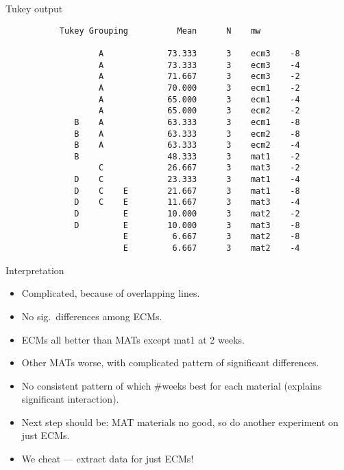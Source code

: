 \documentclass[pdf]{prosper}
\begin{document}
\begin{slide}{Tukey output}

{\scriptsize
\begin{verbatim}
           Tukey Grouping          Mean      N    mw

                   A             73.333      3    ecm3    -8
                   A             73.333      3    ecm3    -4
                   A             71.667      3    ecm3    -2
                   A             70.000      3    ecm1    -2
                   A             65.000      3    ecm1    -4
                   A             65.000      3    ecm2    -2
              B    A             63.333      3    ecm1    -8
              B    A             63.333      3    ecm2    -8
              B    A             63.333      3    ecm2    -4
              B                  48.333      3    mat1    -2
                   C             26.667      3    mat3    -2
              D    C             23.333      3    mat1    -4
              D    C    E        21.667      3    mat1    -8
              D    C    E        11.667      3    mat3    -4
              D         E        10.000      3    mat2    -2
              D         E        10.000      3    mat3    -8
                        E         6.667      3    mat2    -8
                        E         6.667      3    mat2    -4
\end{verbatim}
}
  
\end{slide}

\begin{slide}{Interpretation}

  \begin{itemize}
  \item Complicated, because of overlapping lines.
  \item No sig.\ differences among ECMs.
  \item ECMs all better than MATs except mat1 at 2 weeks.
  \item Other MATs worse, with complicated pattern of significant differences.
  \item No consistent pattern of which \#weeks best for each material (explains significant interaction).
  \item Next step should be: MAT materials no good, so do another experiment on just ECMs.
  \item We cheat --- extract data for just ECMs!
  \end{itemize}
  
\end{slide}
\end{document}
